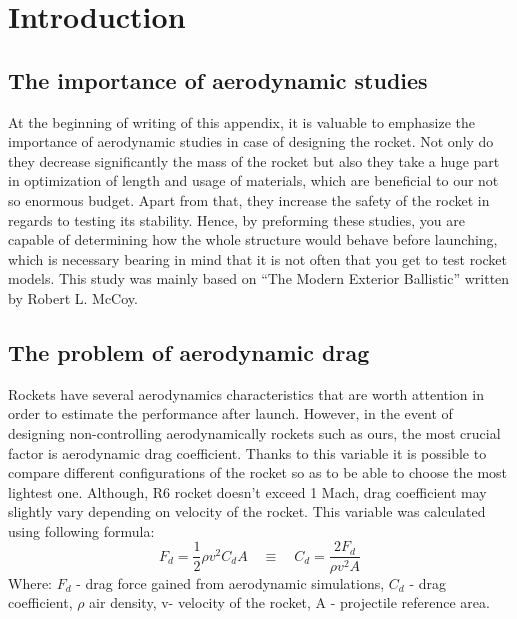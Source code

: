 \documentclass{article}
\begin{document}
\section{Introduction}
\subsection{The importance of aerodynamic studies}
At the beginning of writing of this appendix, it is valuable to emphasize the importance of 
aerodynamic studies in case of designing the rocket.  Not only do they decrease significantly 
the mass of the rocket but also they take a huge part in optimization of length and usage of 
materials, which are beneficial to our not so enormous budget. Apart from that, they increase 
the safety of the rocket in regards to testing its stability. Hence, by preforming these studies, 
you are capable of determining how the whole structure would behave before launching, which is 
necessary bearing in mind that it is not often that you get to test rocket models. This study 
was mainly based on “The Modern Exterior Ballistic” written by Robert L. McCoy.

\subsection{The problem of aerodynamic drag}
Rockets have several aerodynamics characteristics that are worth attention in order to 
estimate the performance after launch. However, in the event of designing non-controlling 
aerodynamically rockets such as ours, the most crucial factor is aerodynamic drag coefficient. 
Thanks to this variable it is possible to compare different configurations of the rocket so as to be able 
to choose the most lightest one. Although, R6 rocket doesn't exceed 1 Mach, drag coefficient 
may slightly vary depending on velocity of the rocket. This variable was calculated 
using following formula:
\begin{equation}
    F_d = \frac{1}{2} \rho v^2 C_d A \quad \equiv \quad C_d = \frac{2F_d}{\rho v^2 A}
\end{equation}
Where: $F_d$ - drag force gained from aerodynamic simulations, $C_d$ - drag coefficient, 
$\rho$ air density, v- velocity of the rocket, A - projectile reference area.\\\\
\end{document}
